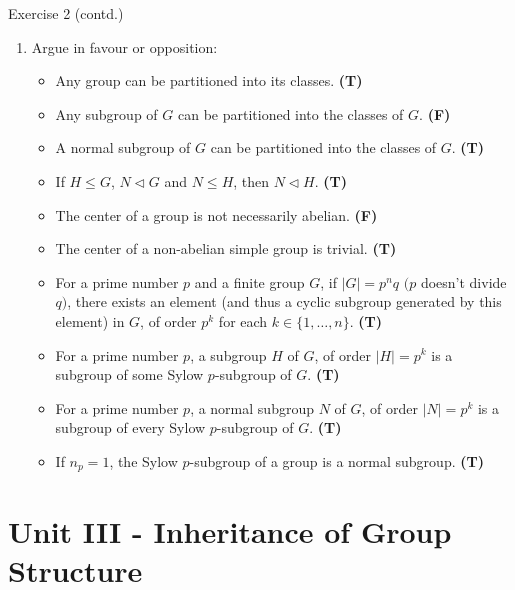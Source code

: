 \documentclass{beamer}
\newcounter{savedenum}
\newcommand*{\resume}{\setcounter{enumi}{\thesavedenum}}
\begin{document}
\begin{frame}{Exercise 2 (contd.)}
    \begin{enumerate}
        \resume
        \item Argue in favour or opposition:
        \begin{itemize}
            \item Any group can be partitioned into its classes. \textbf{(T)}
            \item Any subgroup of $G$ can be partitioned into the classes of $G$. \textbf{(F)}
            \item A normal subgroup of $G$ can be partitioned into the classes of $G$. \textbf{(T)}
            \item If $H\leq G$, $N\vartriangleleft G$ and $N\leq H$, then $N\vartriangleleft H$. \textbf{(T)}
            \item The center of a group is not necessarily abelian. \textbf{(F)}
            \item The center of a non-abelian simple group is trivial. \textbf{(T)}
            \item For a prime number $p$ and a finite group $G$, if $\lvert G\rvert=p^nq$ $(p$ doesn't divide $q)$, there exists an element (and thus a cyclic subgroup generated by this element) in $G$, of order $p^k$ for each $k\in\{1,\dots,n\}$. \textbf{(T)}
            \item For a prime number $p$, a subgroup $H$ of $G$, of order $\lvert H\rvert=p^k$ is a subgroup of some Sylow $p$-subgroup of $G$. \textbf{(T)}
            \item For a prime number $p$, a normal subgroup $N$ of $G$, of order $\lvert N\rvert=p^k$ is a subgroup of every Sylow $p$-subgroup of $G$. \textbf{(T)}
            \item If $n_p=1$, the Sylow $p$-subgroup of a group is a normal subgroup. \textbf{(T)}
        \end{itemize}
    \end{enumerate}
\end{frame}

\section{Unit III - Inheritance of Group Structure}
\end{document}
